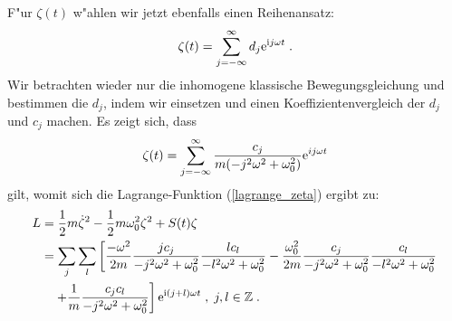   F"ur $\zeta(t)$ w"ahlen wir jetzt ebenfalls einen Reihenansatz:
  \begin{equation}
    \zeta(t) = \sum_{j=-\infty}^\infty d_j \text e^{\text ij\omega t} \; .
  \end{equation}
  Wir betrachten wieder nur die inhomogene klassische Bewegungsgleichung und bestimmen die $d_j$, indem wir einsetzen und einen Koeffizientenvergleich der $d_j$ und $c_j$ machen.
  Es zeigt sich, dass
  \begin{equation}
    \zeta(t) = \sum_{j=-\infty}^\infty \frac{c_j}{m(-j^2\omega^2+\omega_0^2)} \text e^{ij\omega t}
  \end{equation}
  gilt, womit sich die Lagrange-Funktion (\ref{lagrange_zeta}) ergibt zu:
  \begin{align}
    \begin{split}
      L &= \frac{1}{2}m\dot \zeta^2 - \frac{1}{2}m\omega_0^2\zeta^2 + S(t)\zeta \\
       &=\sum_j \sum_l \left[ \frac{-\omega^2}{2m} \frac{jc_j}{-j^2\omega^2+\omega_0^2} \frac{lc_l}{-l^2\omega^2+\omega_0^2}
       -\frac{\omega_0^2}{2m} \frac{c_j}{-j^2\omega^2+\omega_0^2} \frac{c_l}{-l^2\omega^2+\omega_0^2} \right. \\
        &\left. \quad + \frac{1}{m} \frac{c_jc_l}{-j^2\omega^2+\omega_0^2} \right] \text e^{\text i(j+l)\omega t}  \; , \; j,l \in \mathbb{Z} \; .
     \end{split}
   \end{align}
  \iffalse
  \begin{align}
    \begin{split}
      L &= \frac{1}{2}m\dot \zeta^2 - \frac{1}{2}m\omega_0^2\zeta^2 + S(t)\zeta \\
       &=\frac{-\omega^2}{2m} \sum_j \sum_l \frac{jc_j}{-j^2\omega^2+\omega_0^2} \frac{lc_l}{-l^2\omega^2+\omega_0^2} \text e^{\text i(j+l)\omega t}\\
       &\quad-\frac{\omega_0^2}{2m} \sum_j \sum_l \frac{c_j}{-j^2\omega^2+\omega_0^2} \frac{c_l}{-l^2\omega^2+\omega_0^2} \text e^{\text i(j+l)\omega t}\\
       &\quad + \frac{1}{m} \sum_j \sum_l \frac{c_jc_l}{-j^2\omega^2+\omega_0^2} \text e^{\text i(j+l)\omega t}\; , \; j,l \in \mathbb{Z} \; .
     \end{split}
   \end{align}
   \fi

